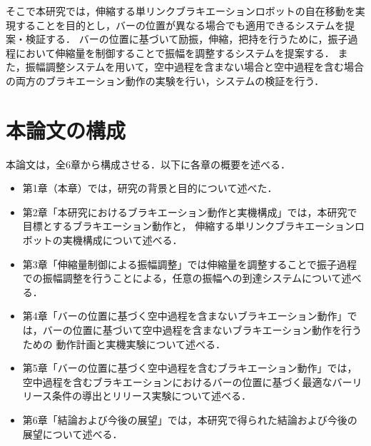           そこで本研究では，伸縮する単リンクブラキエーションロボットの自在移動を実現することを目的とし，バーの位置が異なる場合でも適用できるシステムを提案・検証する．
          バーの位置に基づいて励振，伸縮，把持を行うために，振子過程において伸縮量を制御することで振幅を調整するシステムを提案する．
          また，振幅調整システムを用いて，空中過程を含まない場合と空中過程を含む場合の両方のブラキエーション動作の実験を行い，システムの検証を行う．
          
        \section{本論文の構成}

          本論文は，全6章から構成させる．以下に各章の概要を述べる．
          \begin{itemize}
            \item 第1章（本章）では，研究の背景と目的について述べた．
            \item 第2章「本研究におけるブラキエーション動作と実機構成」では，本研究で目標とするブラキエーション動作と，
            伸縮する単リンクブラキエーションロボットの実機構成について述べる．
            \item 第3章「伸縮量制御による振幅調整」では伸縮量を調整することで振子過程での振幅調整を行うことによる，任意の振幅への到達システムについて述べる．
            \item 第4章「バーの位置に基づく空中過程を含まないブラキエーション動作」では，バーの位置に基づいて空中過程を含まないブラキエーション動作を行うための
            動作計画と実機実験について述べる．
            \item 第5章「バーの位置に基づく空中過程を含むブラキエーション動作」では，空中過程を含むブラキエーションにおけるバーの位置に基づく最適なバーリリース条件の導出とリリース実験について述べる．         
            \item 第6章「結論および今後の展望」では，本研究で得られた結論および今後の展望について述べる．
          \end{itemize}

          

